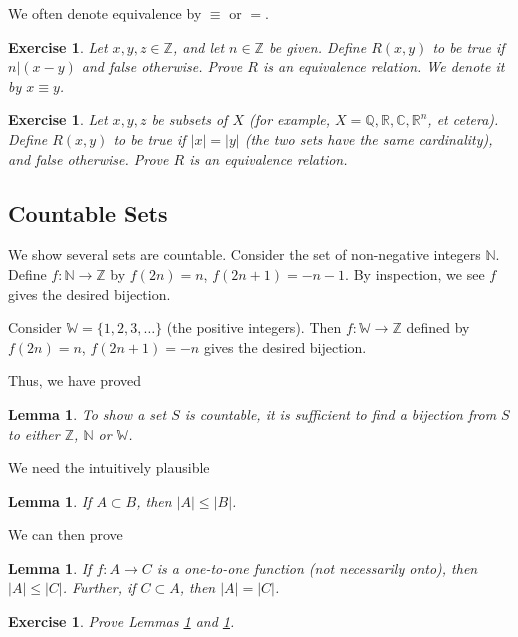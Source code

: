 \documentclass[12pt,letterpaper]{report}
\newcommand{\R}{\ensuremath{\mathbb{R}}}
\newcommand{\C}{\ensuremath{\mathbb{C}}}
\newcommand{\Z}{\ensuremath{\mathbb{Z}}}
\newcommand{\Q}{\mathbb{Q}}
\newcommand{\N}{\mathbb{N}}
\newcommand{\W}{\mathbb{W}}
\newtheorem{lem}[thm]{Lemma}
\newtheorem{exe}[thm]{Exercise}
\begin{document}
We often denote equivalence by $\equiv$ or $=$.

\begin{exe} Let $x,y,z \in \Z$, and let $n \in \Z$ be given. Define
$R(x,y)$ to be true if $n|(x-y)$ and false otherwise. Prove $R$ is
an equivalence relation. We denote it by $x \equiv y$. \end{exe}

\begin{exe} Let $x, y, z$ be subsets of $X$ (for example, $X = \Q,
\R, \C, \R^n$, et cetera). Define $R(x,y)$ to be true if $|x| =
|y|$ (the two sets have the same cardinality), and false
otherwise. Prove $R$ is an equivalence relation. \end{exe}


\subsection{Countable Sets}

We show several sets are countable. Consider the set of
non-negative integers $\N$. Define $f:\N \rightarrow \Z$ by $f(2n)
= n$, $f(2n+1) = -n-1$. By inspection, we see $f$ gives the
desired bijection.

Consider $\W = \{1,2,3,\dots \}$ (the positive integers). Then
$f:\W \rightarrow \Z$ defined by $f(2n) = n$, $f(2n+1)=-n$ gives
the desired bijection.

Thus, we have proved

\begin{lem} To show a set $S$ is countable, it is sufficient to
find a bijection from $S$ to either $\Z$, $\N$ or $\W$.
\end{lem}

We need the intuitively plausible

\begin{lem}\label{lemcardsubsetone} If $A \subset B$, then $|A| \le |B|$. \end{lem}

We can then prove

\begin{lem}\label{lemcardsubsettwo} If $f:A \rightarrow C$ is a one-to-one
function (not necessarily onto), then $|A| \le |C|$. Further, if
$C \subset A$, then $|A| = |C|$. \end{lem}

\begin{exe} Prove Lemmas \ref{lemcardsubsetone} and
\ref{lemcardsubsettwo}. \end{exe}
\end{document}
